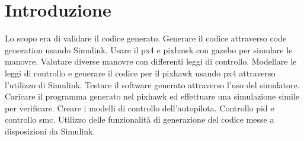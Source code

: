 \chapter{Introduzione}
Lo scopo era di validare il codice generato.
Generare il codice attraverso code generation usando Simulink.
Usare il px4 e pixhawk con gazebo per simulare le manovre.
Valutare diverse manovre con differenti leggi di controllo.
Modellare le leggi di controllo e generare il codice per il pixhawk usando px4 attraverso l'utilizzo di Simulink.
Testare il software generato attraverso l'uso del simulatore. Caricare il programma generato nel pixhawk ed effettuare una simulazione simile per verificare.
Creare i modelli di controllo dell'autopilota.
Controllo pid e controllo smc.
Utilizzo delle funzionalità di generazione del codice messe a disposizioni da Simulink.

